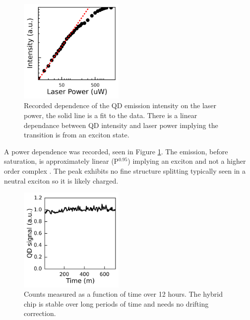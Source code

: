 \begin{figure}[h!] \begin{center}
\includegraphics[width=0.45\textwidth]{images/pdep.png} \caption{Recorded
dependence of the QD emission intensity on the laser power, the solid line is a
fit to the data. There is a linear dependance between QD intensity and laser
power implying the transition is from an exciton state.} \label{fig:pdep}
\end{center} \end{figure}

A power dependence was recorded, seen in Figure \ref{fig:pdep}. The emission,
before saturation, is approximately linear (P$^{0.95}$) implying an exciton and
not a higher order complex \cite{grundmann1997theory}. The peak exhibits no fine
structure splitting typically seen in a neutral exciton
\cite{bayer2002fine,gammon1996fine} so it is likely charged.

\begin{figure}[h!] \begin{center}
\includegraphics[width=0.45\textwidth]{images/stability.png} \caption{
Counts measured as a function of time over 12 hours. The hybrid chip is stable
over long periods of time and needs no drifting correction.
} \label{fig:stab} \end{center}
\end{figure}

